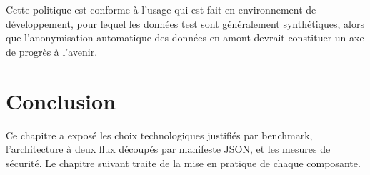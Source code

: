Cette politique est conforme à l'usage qui est fait en environnement de développement, pour lequel les données test sont généralement synthétiques, alors que l'anonymisation automatique des données en amont devrait constituer un axe de progrès à l'avenir.

\section*{Conclusion}

Ce chapitre a exposé les choix technologiques justifiés par benchmark, l'architecture à deux flux découpés par manifeste JSON, et les mesures de sécurité. Le chapitre suivant traite de la mise en pratique de chaque composante.
